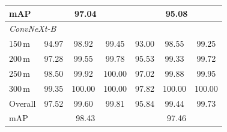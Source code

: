 \documentclass[conference]{IEEEtran}
\begin{document}
\begin{table}[htbp]
\begin{tabular}{l ccc ccc}
mAP      & \multicolumn{3}{c}{97.04} & \multicolumn{3}{c}{95.08} \\
\midrule
\multicolumn{7}{l}{\textit{ConvNeXt-B}} \\
150\,m   & 94.97 & 98.92  & 99.45  & 93.00 & 98.55  & 99.25 \\
200\,m   & 97.28 & 99.55  & 99.78  & 95.53 & 99.33  & 99.72 \\
250\,m   & 98.50 & 99.92  & 100.00 & 97.02 & 99.88  & 99.95 \\
300\,m   & 99.35 & 100.00 & 100.00 & 97.82 & 100.00 & 100.00 \\
\midrule
Overall  & 97.52 & 99.60  & 99.81  & 95.84 & 99.44  & 99.73 \\
mAP      & \multicolumn{3}{c}{98.43} & \multicolumn{3}{c}{97.46} \\
\bottomrule
\end{tabular}
\end{table}
\end{document}
